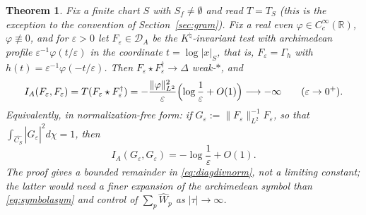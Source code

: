 \documentclass[11pt]{amsart}
\newtheorem{theorem}{Theorem}[section]
\theoremstyle{definition}
\theoremstyle{remark}
\newcommand{\R}{\mathbb R}
\newcommand{\Knat}{K^{\natural}}
\newcommand{\DA}{\mathcal D_A}
\begin{document}
\begin{theorem}\label{thm:infgenus}
Fix a finite chart $S$ with $S_f\ne\emptyset$ and read $T=T_S$ (this is the
exception to the convention of Section~\ref{sec:gram}). Fix a real even $\varphi\in C_c^\infty(\R)$,
$\varphi\not\equiv0$, and for $\varepsilon>0$ let $F_\varepsilon\in\DA$ be the
$\Knat$-invariant test with archimedean profile
$\varepsilon^{-1}\varphi(t/\varepsilon)$ in the coordinate $t=\log|x|_S$, that
is, $F_\varepsilon=\Gamma_h$ with $h(t)=\varepsilon^{-1}\varphi(-t/\varepsilon)$.
Then $F_\varepsilon\star F_\varepsilon^\dagger\to\Delta$ weak-$*$, and
\begin{equation}\label{eq:diagdiv}
  I_A(F_\varepsilon,F_\varepsilon)=T(F_\varepsilon\star F_\varepsilon^\dagger)
   =-\frac{\|\varphi\|_{L^2}^2}{\varepsilon}
     \Bigl(\log\frac1\varepsilon+O(1)\Bigr)\longrightarrow-\infty
   \qquad(\varepsilon\to0^+).
\end{equation}
Equivalently, in normalization-free form: if
$G_\varepsilon:=\|F_\varepsilon\|_{L^2}^{-1}F_\varepsilon$, so that
$\int_{\widehat{C_S}}|\widehat G_\varepsilon|^2d\chi=1$, then
\begin{equation}\label{eq:diagdivnorm}
  I_A(G_\varepsilon,G_\varepsilon)=-\log\frac1\varepsilon+O(1).
\end{equation}
The proof gives a bounded remainder in \eqref{eq:diagdivnorm}, not a limiting
constant; the latter would need a finer expansion of the archimedean symbol
than \eqref{eq:symbolasym} and control of $\sum_p\widehat W_p$ as
$|\tau|\to\infty$.
\end{theorem}
\end{document}
